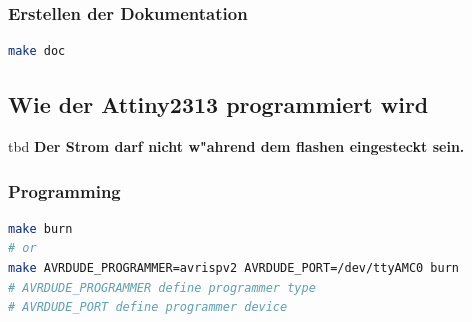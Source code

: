 \subsubsection{Erstellen der Dokumentation}
\begin{lstlisting}[caption={Create documentation},language=sh,label=lst:builddoc]
make doc
\end{lstlisting}
\vspace{0.5cm}


\subsection{Wie der Attiny2313 programmiert wird}
tbd %
\textbf{Der Strom darf nicht w"ahrend dem flashen eingesteckt sein.}

\subsubsection{Programming}
\begin{lstlisting}[caption={Programming},language=sh,label=lst:makeburn]
make burn
# or
make AVRDUDE_PROGRAMMER=avrispv2 AVRDUDE_PORT=/dev/ttyAMC0 burn
# AVRDUDE_PROGRAMMER define programmer type
# AVRDUDE_PORT define programmer device
\end{lstlisting}
\vspace{0.5cm}



